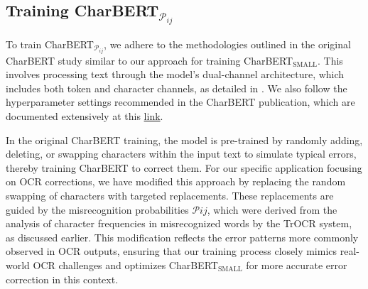 \subsection{Training CharBERT$_{\mathcal{P}_{ij}}$}
\label{subsec:3_training_charbert_pij}
To train CharBERT$_{\mathcal{P}_{ij}}$, we adhere to the methodologies outlined in the original CharBERT study similar to our approach for training CharBERT$_{\text{SMALL}}$. This involves processing text through the model's dual-channel architecture, which includes both token and character channels, as detailed in . We also follow the hyperparameter settings recommended in the CharBERT publication, which are documented extensively at this \href{https://github.com/mawentao277/CharBERT}{link}.

In the original CharBERT training, the model is pre-trained by randomly adding, deleting, or swapping characters within the input text to simulate typical errors, thereby training CharBERT to correct them. For our specific application focusing on OCR corrections, we have modified this approach by replacing the random swapping of characters with targeted replacements. These replacements are guided by the misrecognition probabilities $\mathcal{P}{ij}$, which were derived from the analysis of character frequencies in misrecognized words by the TrOCR system, as discussed earlier. This modification reflects the error patterns more commonly observed in OCR outputs, ensuring that our training process closely mimics real-world OCR challenges and optimizes CharBERT$_{\text{SMALL}}$ for more accurate error correction in this context.

